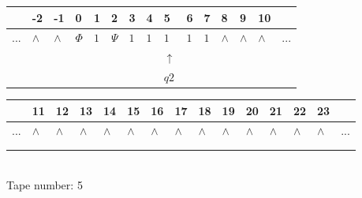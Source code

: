 \documentclass[11pt]{article}
\begin{document}
\begin{table}[H]
\centering
\begin{tabular}{lllllllllllllll}
 & -2 & -1 & 0 & 1 & 2 & 3 & 4 & 5 & 6 & 7 & 8 & 9 & 10 & \\
\hline
$...$ & \multicolumn{1}{|l|}{$\wedge$} & \multicolumn{1}{|l|}{$\wedge$} & \multicolumn{1}{|l|}{$\Phi$} & \multicolumn{1}{|l|}{$1$} & \multicolumn{1}{|l|}{$\Psi$} & \multicolumn{1}{|l|}{$1$} & \multicolumn{1}{|l|}{$1$} & \multicolumn{1}{|l|}{$1$} & \multicolumn{1}{|l|}{$1$} & \multicolumn{1}{|l|}{$1$} & \multicolumn{1}{|l|}{$\wedge$} & \multicolumn{1}{|l|}{$\wedge$} & \multicolumn{1}{|l|}{$\wedge$} & $...$\\
\hline
&  &  &  &  &  &  &  & $\uparrow$ &  &  &  &  &  &  \\
&  &  &  &  &  &  &  & $ q2 $ &  &  &  &  &  &  \\
\end{tabular}
\begin{tabular}{lllllllllllllll}
 & 11 & 12 & 13 & 14 & 15 & 16 & 17 & 18 & 19 & 20 & 21 & 22 & 23 & \\
\hline
$...$ & \multicolumn{1}{|l|}{$\wedge$} & \multicolumn{1}{|l|}{$\wedge$} & \multicolumn{1}{|l|}{$\wedge$} & \multicolumn{1}{|l|}{$\wedge$} & \multicolumn{1}{|l|}{$\wedge$} & \multicolumn{1}{|l|}{$\wedge$} & \multicolumn{1}{|l|}{$\wedge$} & \multicolumn{1}{|l|}{$\wedge$} & \multicolumn{1}{|l|}{$\wedge$} & \multicolumn{1}{|l|}{$\wedge$} & \multicolumn{1}{|l|}{$\wedge$} & \multicolumn{1}{|l|}{$\wedge$} & \multicolumn{1}{|l|}{$\wedge$} & $...$\\
\hline
&  &  &  &  &  &  &  &  &  &  &  &  &  &  \\
&  &  &  &  &  &  &  &  &  &  &  &  &  &  \\
\end{tabular}
\\
Tape number: 5
\noindent\makebox[\linewidth]{\hdashrule{\textwidth}{1pt}{1pt}}\end{table}
\end{document}

